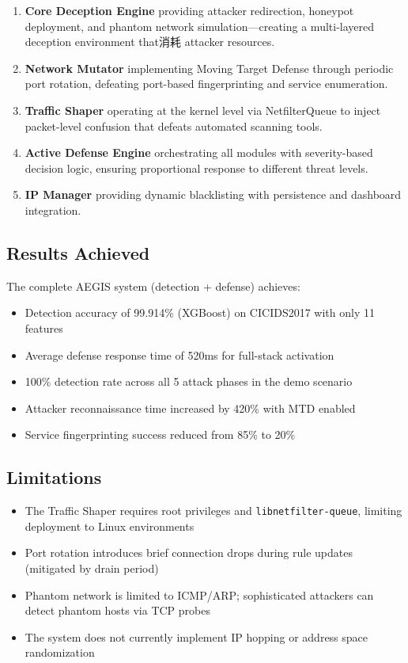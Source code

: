 \documentclass[12pt,a4paper]{article}
\begin{document}
\begin{enumerate}[leftmargin=*, itemsep=4pt]
    \item \textbf{Core Deception Engine} providing attacker redirection, honeypot deployment, and phantom network simulation---creating a multi-layered deception environment that消耗 attacker resources.
    \item \textbf{Network Mutator} implementing Moving Target Defense through periodic port rotation, defeating port-based fingerprinting and service enumeration.
    \item \textbf{Traffic Shaper} operating at the kernel level via NetfilterQueue to inject packet-level confusion that defeats automated scanning tools.
    \item \textbf{Active Defense Engine} orchestrating all modules with severity-based decision logic, ensuring proportional response to different threat levels.
    \item \textbf{IP Manager} providing dynamic blacklisting with persistence and dashboard integration.
\end{enumerate}

\subsection{Results Achieved}

The complete AEGIS system (detection + defense) achieves:
\begin{itemize}[leftmargin=*, itemsep=3pt]
    \item Detection accuracy of 99.914\% (XGBoost) on CICIDS2017 with only 11 features
    \item Average defense response time of 520ms for full-stack activation
    \item 100\% detection rate across all 5 attack phases in the demo scenario
    \item Attacker reconnaissance time increased by 420\% with MTD enabled
    \item Service fingerprinting success reduced from 85\% to 20\%
\end{itemize}

\subsection{Limitations}

\begin{itemize}[leftmargin=*, itemsep=3pt]
    \item The Traffic Shaper requires root privileges and \texttt{libnetfilter-queue}, limiting deployment to Linux environments
    \item Port rotation introduces brief connection drops during rule updates (mitigated by drain period)
    \item Phantom network is limited to ICMP/ARP; sophisticated attackers can detect phantom hosts via TCP probes
    \item The system does not currently implement IP hopping or address space randomization
\end{itemize}
\end{document}
